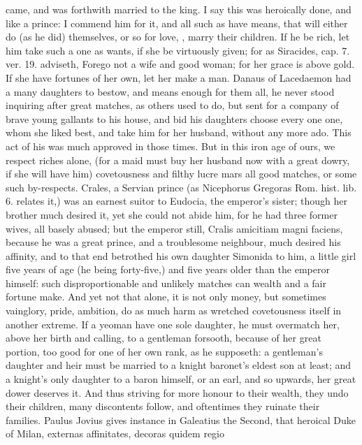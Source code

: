 came, and was forthwith married to the king. I say this was heroically
done, and like a prince: I commend him for it, and all such as have
means, that will either do (as he did) themselves, or so for love, \etc{},
marry their children. If he be rich, let him take such a one as wants,
if she be virtuously given; for as Siracides, cap. 7. ver. 19.
adviseth, Forego not a wife and good woman; for her grace is above
gold. If she have fortunes of her own, let her make a man. Danaus of
Lacedaemon had a many daughters to bestow, and means enough for them
all, he never stood inquiring after great matches, as others used to
do, but sent for a company of brave young gallants to his house,
and bid his daughters choose every one one, whom she liked best, and
take him for her husband, without any more ado. This act of his was
much approved in those times. But in this iron age of ours, we respect
riches alone, (for a maid must buy her husband now with a great dowry,
if she will have him) covetousness and filthy lucre mars all good
matches, or some such by-respects. Crales, a Servian prince (as
Nicephorus Gregoras Rom. hist. lib. 6. relates it,) was an earnest
suitor to Eudocia, the emperor's sister; though her brother much
desired it, yet she could not abide him, for he had three former
wives, all basely abused; but the emperor still, Cralis amicitiam magni
faciens, because he was a great prince, and a troublesome neighbour,
much desired his affinity, and to that end betrothed his own daughter
Simonida to him, a little girl five years of age (he being forty-five,)
and five years older than the emperor himself: such
disproportionable and unlikely matches can wealth and a fair fortune
make. And yet not that alone, it is not only money, but sometimes
vainglory, pride, ambition, do as much harm as wretched covetousness
itself in another extreme. If a yeoman have one sole daughter, he must
overmatch her, above her birth and calling, to a gentleman forsooth,
because of her great portion, too good for one of her own rank, as he
supposeth: a gentleman's daughter and heir must be married to a knight
baronet's eldest son at least; and a knight's only daughter to a baron
himself, or an earl, and so upwards, her great dower deserves it. And
thus striving for more honour to their wealth, they undo their
children, many discontents follow, and oftentimes they ruinate their
families. Paulus Jovius gives instance in Galeatius the Second,
that heroical Duke of Milan, externas affinitates, decoras quidem regio
